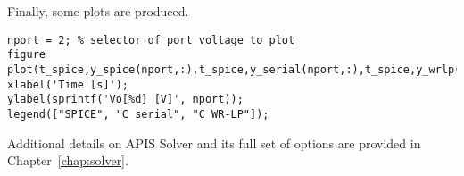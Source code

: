 Finally, some plots are produced.

\begin{lstlisting}[numbers=none]
% port to plot
nport = 2; % selector of port voltage to plot
figure 
plot(t_spice,y_spice(nport,:),t_spice,y_serial(nport,:),t_spice,y_wrlp(nport,:));
xlabel('Time [s]');
ylabel(sprintf('Vo[%d] [V]', nport));
legend(["SPICE", "C serial", "C WR-LP"]);
\end{lstlisting}

Additional details on APIS Solver and its full set of options are provided in Chapter~\ref{chap:solver}.
